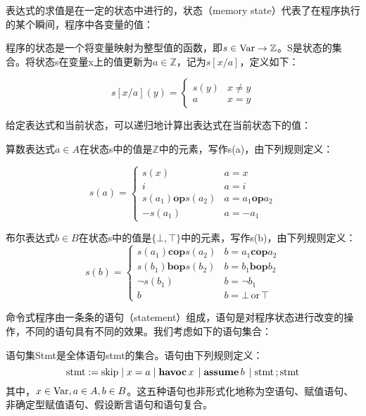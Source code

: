 表达式的求值是在一定的状态中进行的，状态（memory state）代表了在程序执行的某个瞬间，程序中各变量的值：

\begin{definition}
  程序的状态是一个将变量映射为整型值的函数，即$s \in \operatorname{Var} \rightarrow \mathbb{Z}$。S是状态的集合。将状态s在变量x上的值更新为$a \in \mathbb{Z}$，记为$s [x / a]$，定义如下：
  
  \[ s [x / a] (y) = \left\{ \begin{array}{cc}
       s (y) & x \neq y\\
       a & x = y
     \end{array} \right. \]
     
\end{definition}

给定表达式和当前状态，可以递归地计算出表达式在当前状态下的值：

\begin{definition}
  算数表达式$a \in A$在状态s中的值是$\mathbb{Z}$中的元素，写作s(a)，由下列规则定义：
  
  \[ s (a) = \left\{ \begin{array}{ll}
       s (x) & a = x\\
       i & a = i\\
       s (a_1)  \mathbin{\mathbf{op}} s (a_2) & a = a_1  \mathbin{\mathbf{op}} a_2\\
       - s (a_1) & a = - a_1
     \end{array} \right. \]
\end{definition}

\begin{definition}
  布尔表达式$b \in B$在状态s中的值是$\{ \bot, \top
  \}$中的元素，写作s(b)，由下列规则定义：
  \[ s (b) = \left\{ \begin{array}{ll}
       s (a_1)  \mathbin{\mathbf{cop}} s (a_2) & b = a_1  \mathbin{\mathbf{cop}} a_2\\
       s (b_1)  \mathbin{\mathbf{bop}} s (b_2) & b = b_1  \mathbin{\mathbf{bop}} b_2\\
       \neg s (b_1)  & b = \neg b_1\\
       b & b = \bot \, \mathrm{or} \, \top
     \end{array} \right. \]
\end{definition}

命令式程序由一条条的语句（statement）组成，语句是对程序状态进行改变的操作，不同的语句具有不同的效果。我们考虑如下的语句集合：

\begin{definition}
  语句集Stmt是全体语句stmt的集合。语句由下列规则定义：
  \[ \operatorname{stmt} := \mathbf{\operatorname{skip}} \mid x = a \mid
     \mathbf{havoc} \, x \, \mid \mathbf{assume} \,b \, \mid
     \operatorname{stmt} \mathbf{;} \operatorname{stmt} \]
  其中，$x \in \operatorname{Var}, a \in A, b \in B$。这五种语句也非形式化地称为空语句、赋值语句、非确定型赋值语句、假设断言语句和语句复合。
\end{definition}

